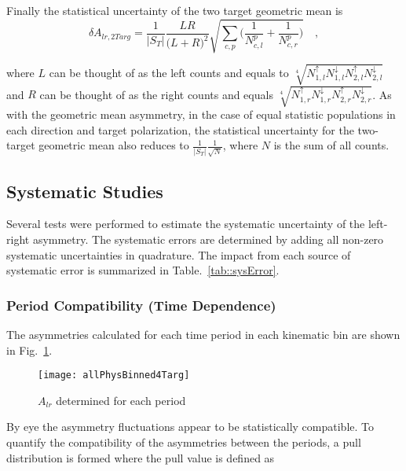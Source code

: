 Finally the statistical uncertainty of the two target geometric mean is
\begin{equation}
  \delta A_{lr,2Targ} = \frac{1}{|S_T|}
  \frac{LR}{\Big( L+R \Big)^2}
  \sqrt{
    \sum_{c,p}
    \Big(
    \frac{1}{N_{c,l}^{p}}
    + \frac{1}{N_{c,r}^p}
    \Big)
  } \quad,
\end{equation}

\noindent
where $L$ can be thought of as the left counts and equals to
$\sqrt[4]{N_{1,l}^\uparrow N_{1,l}^\downarrow N_{2,l}^\uparrow
  N_{2,l}^\downarrow}$ and $R$ can be thought of as the right counts and equals
$\sqrt[4]{N_{1,r}^\uparrow N_{1,r}^\downarrow N_{2,r}^\uparrow
  N_{2,r}^\downarrow}$.  As with the geometric mean asymmetry, in the case of
equal statistic populations in each direction and target polarization, the
statistical uncertainty for the two-target geometric mean also reduces to
$\frac{1}{|S_T|}\frac{1}{\sqrt{N}}$, where $N$ is the sum of all counts.


\subsection{Systematic Studies} \label{sec::systematics}
Several tests were performed to estimate the systematic uncertainty of the
left-right asymmetry.  The systematic errors are determined by adding all
non-zero systematic uncertainties in quadrature.  The impact from each source of
systematic error is summarized in Table.~\ref{tab::sysError}.

\subsubsection{Period Compatibility (Time Dependence)}\label{sec::sysPulls}
The asymmetries calculated for each time period in each kinematic bin are shown
in Fig.~\ref{fig::allPhysBinned4Targ}.

\begin{figure}[h!t]
  \begin{center}
    \texttt{[image: allPhysBinned4Targ]}
    \caption{$A_{lr}$ determined for each period}
    \label{fig::allPhysBinned4Targ}
  \end{center}
\end{figure}

\noindent
By eye the asymmetry fluctuations appear to be statistically compatible.  To
quantify the compatibility of the asymmetries between the periods, a pull
distribution is formed where the pull value is defined as

